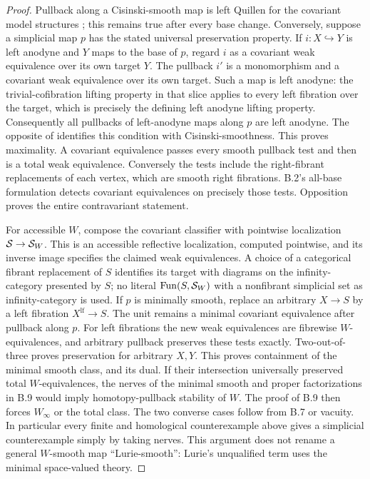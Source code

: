\begin{proof}
Pullback along a Cisinski-smooth map is left Quillen for the covariant model
structures \citep[Proposition 4.4.18]{BCCisinski2019}; this remains true
after every base change. Conversely, suppose a simplicial map $p$ has the
stated universal preservation property. If $i:X\hookrightarrow Y$ is
left anodyne and $Y$ maps to the base of $p$, regard $i$ as a covariant
weak equivalence over its own target $Y$. The pullback $i'$ is a monomorphism
and a covariant weak equivalence over its own target. Such a map is left
anodyne: the trivial-cofibration lifting property in that slice applies to
every left fibration over the target, which is precisely the defining left
anodyne lifting property. Consequently all pullbacks of left-anodyne maps
along $p$ are left anodyne. The opposite of
\citet[Proposition 4.4.4]{BCCisinski2019} identifies this condition with
Cisinski-smoothness. This proves maximality.
A covariant equivalence passes every smooth pullback test and then is a
total weak equivalence. Conversely the tests include the right-fibrant
replacements of each vertex, which are smooth right fibrations.
B.2's all-base formulation detects covariant equivalences on precisely
those tests. Opposition proves the entire contravariant statement.

For accessible $W$, compose the covariant classifier with pointwise
localization $\mathcal S\to\mathcal S_W$. This is an accessible reflective
localization, computed pointwise, and its inverse image specifies the
claimed weak equivalences. A choice of a categorical fibrant replacement
of $S$ identifies its target with diagrams on the infinity-category
presented by $S$; no literal $\mathrm{Fun}(S,\mathcal S_W)$ with a nonfibrant
simplicial set as infinity-category is used.
If $p$ is minimally smooth, replace an arbitrary $X\to S$ by a left
fibration $X^{\mathrm{lf}}\to S$. The unit remains a minimal covariant
equivalence after pullback along $p$. For left fibrations the new weak
equivalences are fibrewise $W$-equivalences, and arbitrary pullback preserves
these tests exactly. Two-out-of-three proves preservation for arbitrary
$X,Y$. This proves containment of the minimal smooth class, and its dual.
If their intersection universally preserved total $W$-equivalences, the
nerves of the minimal smooth and proper factorizations in B.9 would imply
homotopy-pullback stability of $W$. The proof of B.9 then forces $W_\infty$
or the total class. The two converse cases follow from B.7 or vacuity.
In particular every finite and homological counterexample above gives a
simplicial counterexample simply by taking nerves. This argument does not
rename a general $W$-smooth map ``Lurie-smooth'': Lurie's unqualified term
uses the minimal space-valued theory.
\end{proof}
